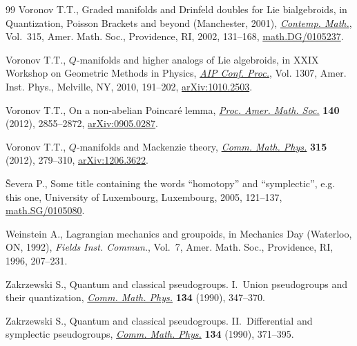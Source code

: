 \documentclass[pdftex]{sigma}
\numberwithin{equation}{section}
\theoremstyle{definition}
\begin{document}
\begin{thebibliography}{99}
Voronov T.T., Graded manifolds and {D}rinfeld doubles for {L}ie bialgebroids,
 in Quantization, {P}oisson Brackets and beyond ({M}anchester, 2001),
 \href{https://doi.org/10.1090/conm/315/05478}{\textit{Contemp. Math.}}, Vol.~315, Amer. Math. Soc., Providence, RI, 2002,
 131--168, \href{https://arxiv.org/abs/math.DG/0105237}{math.DG/0105237}.

Voronov T.T., {$Q$}-manifolds and higher analogs of {L}ie algebroids, in X{XIX}
 {W}orkshop on {G}eometric {M}ethods in {P}hysics, \href{https://doi.org/10.1063/1.3527417}{\textit{AIP Conf. Proc.}},
 Vol. 1307, Amer. Inst. Phys., Melville, NY, 2010, 191--202,
 \href{https://arxiv.org/abs/1010.2503}{arXiv:1010.2503}.

Voronov T.T., On a non-abelian {P}oincar\'{e} lemma, \href{https://doi.org/10.1090/S0002-9939-2011-11116-X}{\textit{Proc. Amer. Math.
 Soc.}} \textbf{140} (2012), 2855--2872, \href{https://arxiv.org/abs/0905.0287}{arXiv:0905.0287}.

Voronov T.T., {$Q$}-manifolds and {M}ackenzie theory, \href{https://doi.org/10.1007/s00220-012-1568-y}{\textit{Comm. Math.
 Phys.}} \textbf{315} (2012), 279--310, \href{https://arxiv.org/abs/1206.3622}{arXiv:1206.3622}.

\v{S}evera P., Some title containing the words ``homotopy'' and ``symplectic'',
 e.g. this one, University of Luxembourg, Luxembourg, 2005, 121--137,
 \href{https://arxiv.org/abs/math.SG/0105080}{math.SG/0105080}.

Weinstein A., Lagrangian mechanics and groupoids, in Mechanics Day ({W}aterloo,
 {ON}, 1992), \textit{Fields Inst. Commun.}, Vol.~7, Amer. Math. Soc.,
 Providence, RI, 1996, 207--231.

Zakrzewski S., Quantum and classical pseudogroups. {I}.~{U}nion pseudogroups
 and their quantization, \href{https://doi.org/10.1007/BF02097706}{\textit{Comm. Math. Phys.}} \textbf{134} (1990),
 347--370.

Zakrzewski S., Quantum and classical pseudogroups. {II}.~{D}ifferential and
 symplectic pseudogroups, \href{https://doi.org/10.1007/BF02097707}{\textit{Comm. Math. Phys.}} \textbf{134} (1990),
 371--395.

\end{thebibliography}\LastPageEnding
\end{document}
